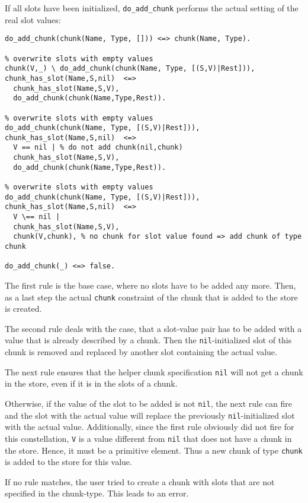 If all slots have been initialized, \verb|do_add_chunk| performs the actual setting of the real slot values:
  
\begin{lstlisting}[caption={Additional rules for adding chunks}]  
% base case
do_add_chunk(chunk(Name, Type, [])) <=> chunk(Name, Type). 

% overwrite slots with empty values
chunk(V,_) \ do_add_chunk(chunk(Name, Type, [(S,V)|Rest])), chunk_has_slot(Name,S,nil)  <=>
  chunk_has_slot(Name,S,V), 
  do_add_chunk(chunk(Name,Type,Rest)).

% overwrite slots with empty values  
do_add_chunk(chunk(Name, Type, [(S,V)|Rest])), chunk_has_slot(Name,S,nil)  <=> 
  V == nil | % do not add chunk(nil,chunk)
  chunk_has_slot(Name,S,V), 
  do_add_chunk(chunk(Name,Type,Rest)).  

% overwrite slots with empty values  
do_add_chunk(chunk(Name, Type, [(S,V)|Rest])), chunk_has_slot(Name,S,nil)  <=> 
  V \== nil |
  chunk_has_slot(Name,S,V), 
  chunk(V,chunk), % no chunk for slot value found => add chunk of type chunk 
  
do_add_chunk(_) <=> false.
\end{lstlisting}

The first rule is the base case, where no slots have to be added any more. Then, as a last step the actual \verb|chunk| constraint of the chunk that is added to the store is created.

The second rule deals with the case, that a slot-value pair has to be added with a value that is already described by a chunk. Then the \verb|nil|-initialized slot of this chunk is removed and replaced by another slot containing the actual value.

The next rule ensures that the helper chunk specification \verb|nil| will not get a chunk in the store, even if it is in the slots of a chunk.

Otherwise, if the value of the slot to be added is not \verb|nil|, the next rule can fire and the slot with the actual value will replace the previously \verb|nil|-initialized slot with the actual value. Additionally, since the first rule obviously did not fire for this constellation, \verb|V| is a value different from \verb|nil| that does not have a chunk in the store. Hence, it must be a primitive element. Thus a new chunk of type \verb|chunk| is added to the store for this value.

If no rule matches, the user tried to create a chunk with slots that are not specified in the chunk-type. This leads to an error.

